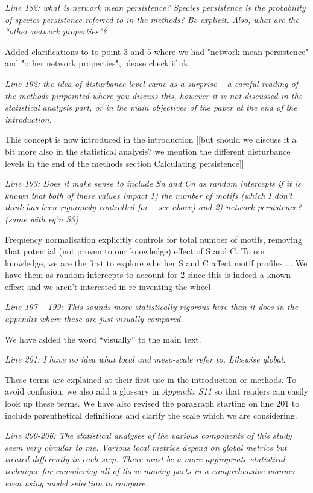 \documentclass[12pt]{article}
\newcommand{\us}{\rm \setlength{\leftskip}{0.3cm} \setlength{\rightskip}{0.3cm}}
\newcommand{\them}{\it \setlength{\leftskip}{0cm} \setlength{\rightskip}{0cm}}
\begin{document}
\them
Line 182: what is network mean persistence? Species persistence is the probability of species persistence referred to in the methods? Be explicit. Also, what are the “other network properties”?

\us
Added clarifications to to point 3 and 5 where we had "network mean persistence" and "other network properties", please check if ok. 

\them
Line 192: the idea of disturbance level came as a surprise – a careful reading of the methods pinpointed where you discuss this, however it is not discussed in the statistical analysis part, or in the main objectives of the paper at the end of the introduction.

\us This concept is now introduced in the introduction [[but should we discuss it a bit more also in the statistical analysis? we mention the different disturbance levels in the end of the methods section Calculating persistence]]

\them
Line 193: Does it make sense to include Sn and Cn as random intercepts if it is known that both of these values impact 1) the number of motifs (which I don’t think has been rigorously controlled for – see above) and 2) network persistence? (same with eq’n S3)

\us Frequency normalisation explicitly controls for total number of motifs, removing that potential (not proven to our knowledge) effect of S and C. To our knowledge, we are the first to explore whether S and C affect motif profiles ... 
We have them as random intercepts to account for 2 since this is indeed a known effect and we aren't interested in re-inventing the wheel

\them
Line 197 – 199: This sounds more statistically rigorous here than it does in the appendix where these are just visually compared.

\us We have added the word ``visually'' to the main text.

\them
Line 201: I have no idea what local and meso-scale refer to. Likewise global.

\us These terms are explained at their first use in the introduction or methods. To avoid confusion, we also add a glossary in \emph{Appendix S11} so that readers can easily look up these terms. We have also revised the paragraph starting on line 201 to include parenthetical definitions and clarify the scale which we are considering.

\them
Line 200-206: The statistical analyses of the various components of this study seem very circular to me. Various local metrics depend on global metrics but treated differently in each step. There must be a more appropriate statistical technique for considering all of these moving parts in a comprehensive manner – even using model selection to compare.
\end{document}
